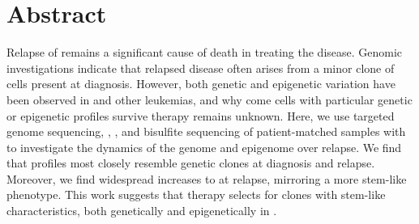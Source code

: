 \section{Abstract}

Relapse of  remains a significant cause of death in treating the disease.
Genomic investigations indicate that relapsed disease often arises from a minor clone of cells present at diagnosis.
However, both genetic and epigenetic variation have been observed in  and other leukemias, and why come cells with particular genetic or epigenetic profiles survive therapy remains unknown.
Here, we use targeted genome sequencing, , , and bisulfite sequencing of patient-matched samples with  to investigate the dynamics of the genome and epigenome over  relapse.
We find that  profiles most closely resemble genetic clones at diagnosis and relapse.
Moreover, we find widespread increases to  at relapse, mirroring a more stem-like phenotype.
This work suggests that therapy selects for clones with stem-like characteristics, both genetically and epigenetically in .
